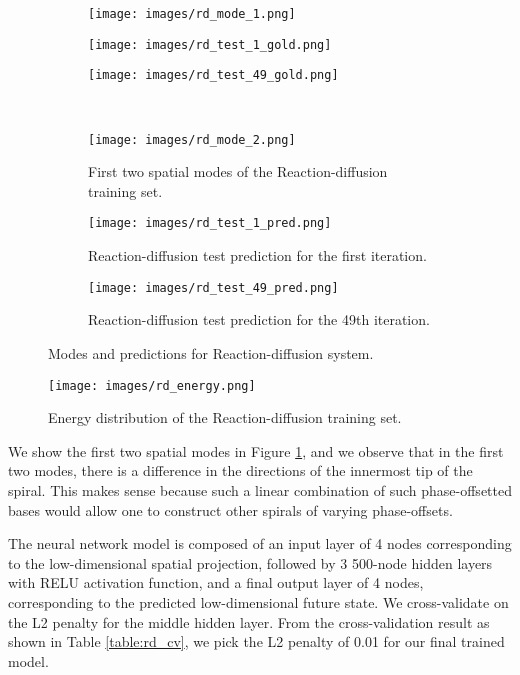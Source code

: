 \documentclass[letterpaper, 10 pt, conference]{ieeeconf}  %
\begin{document}
\begin{figure*}[htb]
\centering

\begin{subfigure}{0.30\textwidth}
  \centering
  \texttt{[image: images/rd\_mode\_1.png]}
\end{subfigure}
\begin{subfigure}{0.30\textwidth}
  \centering
  \texttt{[image: images/rd\_test\_1\_gold.png]}
\end{subfigure}
\begin{subfigure}{0.30\textwidth}
  \centering
  \texttt{[image: images/rd\_test\_49\_gold.png]}
\end{subfigure}\\
  
\begin{subfigure}{0.30\textwidth}
  \centering
  \texttt{[image: images/rd\_mode\_2.png]}
  \caption{First two spatial modes of the Reaction-diffusion training set.}
  \label{fig:rd_modes}
\end{subfigure}
\begin{subfigure}{0.30\textwidth}
  \centering
  \texttt{[image: images/rd\_test\_1\_pred.png]}
  \caption{Reaction-diffusion test prediction for the first iteration.}
  \label{fig:rd_test_1}
\end{subfigure}
\begin{subfigure}{0.30\textwidth}
  \centering
  \texttt{[image: images/rd\_test\_49\_pred.png]}
  \caption{Reaction-diffusion test prediction for the 49th iteration.}
  \label{fig:rd_test_49}
\end{subfigure}
\caption{Modes and predictions for Reaction-diffusion system.}
\end{figure*}

\begin{figure}[htb]
\centering
\texttt{[image: images/rd\_energy.png]}
\caption{Energy distribution of the Reaction-diffusion training set.}
\label{fig:rd_energy}
\end{figure}

We show the first two spatial modes in Figure \ref{fig:rd_modes}, and we observe that in the first two modes, there is a difference in the directions of the innermost tip of the spiral. This makes sense because such a linear combination of such phase-offsetted bases would allow one to construct other spirals of varying phase-offsets.

The neural network model is composed of an input layer of 4 nodes corresponding to the low-dimensional spatial projection, followed by 3 500-node hidden layers with RELU activation function, and a final output layer of 4 nodes, corresponding to the predicted low-dimensional future state. We cross-validate on the L2 penalty for the middle hidden layer. From the cross-validation result as shown in Table \ref{table:rd_cv}, we pick the L2 penalty of 0.01 for our final trained model.
\end{document}
